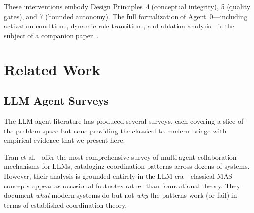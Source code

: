 \documentclass{article}
\begin{document}
\noindent
These interventions embody Design Principles~4 (conceptual integrity), 5 (quality
gates), and 7 (bounded autonomy). The full formalization of Agent~0---including
activation conditions, dynamic role transitions, and ablation analysis---is the
subject of a companion paper~\citep{viswanathan2026agent0}.


\section{Related Work}
\label{sec:related}

\subsection{LLM Agent Surveys}
\label{sec:rel-surveys}

%
%
%
%
%
%

The LLM agent literature has produced several surveys, each covering a slice of the
problem space but none providing the classical-to-modern bridge with empirical evidence
that we present here.

Tran et al.~\citep{tran2025multiagent} offer the most comprehensive survey of multi-agent
collaboration mechanisms for LLMs, cataloging coordination patterns across dozens of
systems. However, their analysis is grounded entirely in the LLM era---classical MAS
concepts appear as occasional footnotes rather than foundational theory. They document
\emph{what} modern systems do but not \emph{why} the patterns work (or fail) in terms
of established coordination theory.
\end{document}
